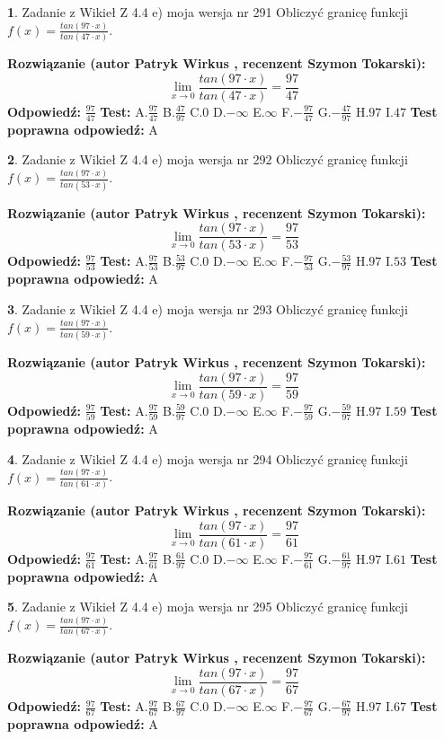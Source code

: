 \documentclass[12pt, a4paper]{article}
\theoremstyle{definition} %
\newtheorem{zad}{}
\newcommand{\zadStart}[1]{\begin{zad}#1\newline}
\newcommand{\zadStop}{\end{zad}}
\newcommand{\rozwStart}[2]{\noindent \textbf{Rozwiązanie (autor #1 , recenzent #2): }\newline}
\newcommand{\rozwStop}{\newline}
\newcommand{\odpStart}{\noindent \textbf{Odpowiedź:}\newline}
\newcommand{\odpStop}{\newline}
\newcommand{\testStart}{\noindent \textbf{Test:}\newline}
\newcommand{\testStop}{\newline}
\newcommand{\kluczStart}{\noindent \textbf{Test poprawna odpowiedź:}\newline}
\newcommand{\kluczStop}{\newline}
\begin{document}
\zadStart{Zadanie z Wikieł Z 4.4 e) moja wersja nr 291}
Obliczyć granicę funkcji $f(x)=\frac{tan(97\cdot x)}{tan(47\cdot x)}$.
\zadStop
\rozwStart{Patryk Wirkus}{Szymon Tokarski}
$$\lim\limits_{x\to 0}\frac{tan(97\cdot x)}{tan(47\cdot x)}=
\frac{97}{47}$$
\rozwStop
\odpStart
$\frac{97}{47}$
\odpStop
\testStart
A.$\frac{97}{47}$
B.$\frac{47}{97}$
C.$0$
D.$-\infty$
E.$\infty$
F.$-\frac{97}{47}$
G.$-\frac{47}{97}$
H.$97$
I.$47$
\testStop
\kluczStart
A
\kluczStop



\zadStart{Zadanie z Wikieł Z 4.4 e) moja wersja nr 292}
Obliczyć granicę funkcji $f(x)=\frac{tan(97\cdot x)}{tan(53\cdot x)}$.
\zadStop
\rozwStart{Patryk Wirkus}{Szymon Tokarski}
$$\lim\limits_{x\to 0}\frac{tan(97\cdot x)}{tan(53\cdot x)}=
\frac{97}{53}$$
\rozwStop
\odpStart
$\frac{97}{53}$
\odpStop
\testStart
A.$\frac{97}{53}$
B.$\frac{53}{97}$
C.$0$
D.$-\infty$
E.$\infty$
F.$-\frac{97}{53}$
G.$-\frac{53}{97}$
H.$97$
I.$53$
\testStop
\kluczStart
A
\kluczStop



\zadStart{Zadanie z Wikieł Z 4.4 e) moja wersja nr 293}
Obliczyć granicę funkcji $f(x)=\frac{tan(97\cdot x)}{tan(59\cdot x)}$.
\zadStop
\rozwStart{Patryk Wirkus}{Szymon Tokarski}
$$\lim\limits_{x\to 0}\frac{tan(97\cdot x)}{tan(59\cdot x)}=
\frac{97}{59}$$
\rozwStop
\odpStart
$\frac{97}{59}$
\odpStop
\testStart
A.$\frac{97}{59}$
B.$\frac{59}{97}$
C.$0$
D.$-\infty$
E.$\infty$
F.$-\frac{97}{59}$
G.$-\frac{59}{97}$
H.$97$
I.$59$
\testStop
\kluczStart
A
\kluczStop



\zadStart{Zadanie z Wikieł Z 4.4 e) moja wersja nr 294}
Obliczyć granicę funkcji $f(x)=\frac{tan(97\cdot x)}{tan(61\cdot x)}$.
\zadStop
\rozwStart{Patryk Wirkus}{Szymon Tokarski}
$$\lim\limits_{x\to 0}\frac{tan(97\cdot x)}{tan(61\cdot x)}=
\frac{97}{61}$$
\rozwStop
\odpStart
$\frac{97}{61}$
\odpStop
\testStart
A.$\frac{97}{61}$
B.$\frac{61}{97}$
C.$0$
D.$-\infty$
E.$\infty$
F.$-\frac{97}{61}$
G.$-\frac{61}{97}$
H.$97$
I.$61$
\testStop
\kluczStart
A
\kluczStop



\zadStart{Zadanie z Wikieł Z 4.4 e) moja wersja nr 295}
Obliczyć granicę funkcji $f(x)=\frac{tan(97\cdot x)}{tan(67\cdot x)}$.
\zadStop
\rozwStart{Patryk Wirkus}{Szymon Tokarski}
$$\lim\limits_{x\to 0}\frac{tan(97\cdot x)}{tan(67\cdot x)}=
\frac{97}{67}$$
\rozwStop
\odpStart
$\frac{97}{67}$
\odpStop
\testStart
A.$\frac{97}{67}$
B.$\frac{67}{97}$
C.$0$
D.$-\infty$
E.$\infty$
F.$-\frac{97}{67}$
G.$-\frac{67}{97}$
H.$97$
I.$67$
\testStop
\kluczStart
A
\kluczStop
\end{document}
